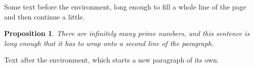 \documentclass[12pt]{article}
\theoremstyle{break}
\newtheorem{prop}{Proposition}
\begin{document}
Some text before the environment, long enough to fill a whole line of the page and then continue a little.
\begin{prop}
There are infinitely many prime numbers, and this sentence is long enough that it has to wrap onto a second line of the paragraph.
\end{prop}
Text after the environment, which starts a new paragraph of its own.
\end{document}
